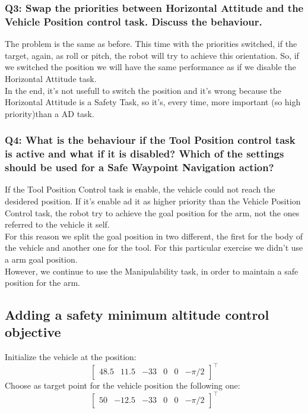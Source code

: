 \documentclass{article}
\begin{document}
\subsubsection{Q3: Swap the priorities between Horizontal Attitude and the Vehicle Position control task. Discuss the behaviour.}
The problem is the same as before. This time with the priorities switched, if the target, again, as roll or pitch, the robot will try to achieve this orientation. 
So, if we switched the position we will have the same performance as if we disable the Horizontal Attitude task.\\
In the end, it's not usefull to switch the position and it's wrong because the Horizontal Attitude is a Safety Task, so it's, every time, more important (so high priority)than a AD task. 

\subsubsection{Q4: What is the behaviour if the Tool Position control task is active and what if it is disabled? Which of the settings should be used for a Safe Waypoint Navigation action?}
If the Tool Position Control task is enable, the vehicle could not reach the desidered position. If it's enable ad it as higher priority than the Vehicle Position Control task, the robot try to achieve the goal position for the arm, not the ones referred to the vehicle it self. \\
For this reason we split the goal position in two different, the first for the body of the vehicle and another one for the tool. For this particular exercise we didn't use a arm goal position. \\
However, we continue to use the Manipulability task, in order to maintain a safe position for the arm. %

\clearpage

\subsection{Adding a safety minimum altitude control objective}
Initialize the vehicle at the position:
\begin{displaymath}
\begin{bmatrix} 48.5 & 11.5 & -33 & 0 & 0 &-\pi/2\end{bmatrix}^\top
\end{displaymath} 
Choose as target point for the vehicle position the following one:
\begin{displaymath}
\begin{bmatrix} 50 & -12.5 & -33 & 0 & 0 &-\pi/2 \end{bmatrix}^\top
\end{displaymath}
\end{document}
